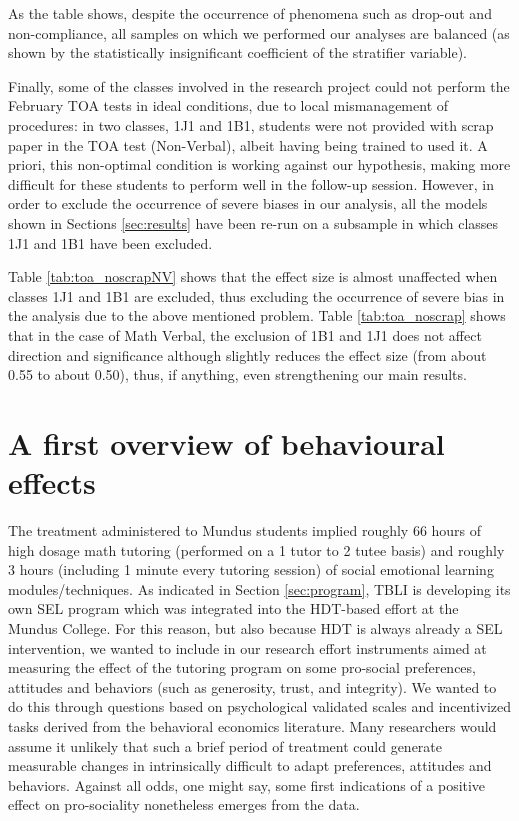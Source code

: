 \documentclass[ 12 pt]{article}
\begin{document}


As the table shows, despite the occurrence of phenomena such as drop-out and non-compliance, all samples on which we performed our analyses are balanced (as shown by the statistically insignificant coefficient of the stratifier variable). 

Finally, some of the classes involved in the research project could not perform the February TOA tests in ideal conditions, due to local mismanagement of procedures: in two classes, 1J1 and 1B1, students were not provided with scrap paper in the TOA test (Non-Verbal), albeit having being trained to used it. A priori, this non-optimal condition is working against our hypothesis, making more difficult for these students to perform well in the follow-up session. However, in order to exclude the occurrence of severe biases in our analysis, all the models shown in Sections \ref{sec:results} have been re-run on a subsample in which classes 1J1 and 1B1 have been excluded.




Table \ref{tab:toa_noscrapNV} shows that the effect size is almost unaffected when classes 1J1 and 1B1 are excluded, thus excluding the occurrence of severe bias in the analysis due to the above mentioned problem. Table \ref{tab:toa_noscrap} shows that in the case of Math Verbal, the exclusion of 1B1 and 1J1 does not affect direction and significance although slightly reduces the effect size (from about 0.55 to about 0.50), thus, if anything, even strengthening our main results.

\section{A first overview of behavioural effects}
\label{sec:sel}
The treatment administered to Mundus students implied roughly 66 hours of high dosage math tutoring (performed on a 1 tutor to 2 tutee basis) and roughly 3 hours (including 1 minute every tutoring session) of social emotional learning modules/techniques.
As indicated in Section \ref{sec:program}, TBLI is developing its own SEL program which was integrated into the HDT-based effort at the Mundus College. 
For this reason, but also because HDT is always already a SEL intervention, we wanted to include in our research effort instruments aimed at measuring the effect of the tutoring program on some pro-social preferences, attitudes and behaviors (such as generosity, trust, and integrity). We wanted to do this through questions based on psychological validated scales and incentivized tasks derived from the behavioral economics literature.
Many researchers would assume it unlikely that such a brief period of treatment could generate measurable changes in intrinsically difficult to adapt preferences, attitudes and behaviors. Against all odds, one might say, some first indications of a positive effect on pro-sociality nonetheless emerges from the data.
\end{document}
